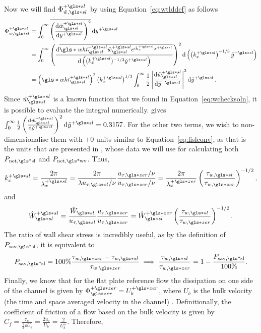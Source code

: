 Now we will find $\Phi _{\tilde{w},\gls*{sl}}\ps$ by using Equation~\eqref{eq:wtlddef} as follows
\begin{align}
	\Phi _{\tilde{w},\gls*{sl}}\ps &= \int_{0}^{\infty} \overline{\left( \dv{\tilde{w}\ssl\ps}{y\ps}  \right) ^2} \dd{y\ps}   \\
				       &= \int_{0}^{\infty} \left( \dv{\overline{\gls*{wht}\ps\ssl\check{w}\ssl\ps e^{ik\ps_x x\ps}}}{\left((k_x\ps)^{-1 /3}\check{y}\ps\right)}  \right) ^2 \dd{\left(\left(k_x\ps\right)^{-1 /3}\check{y}\ps\right)}   \\
				       &= \left(\gls*{wht}\ps\ssl\right)^2\left(k_x\ps\right)^{1 /3}\int_{0}^{\infty}\frac{1}{2} \left| \dv{\check{w}\ssl\ps}{\check{y}\ps}  \right| ^2 \dd{\check{y}\ps} \label{eq:fislps}
.\end{align}
Since $\check{w}\ssl\ps$ is a known function that we found in Equation~\eqref{eq:wchecksoln}, it is possible to evaluate the integral numerically. \textcite{chernyshenko2013} gives $\int_{0}^{\infty}  \frac{1}{2} \left( \dv{\check{w}\ssl\ps}{\check{y}\ps}  \right) ^2 \dd{\check{y}\ps} = 0.3157$. For the other two terms, we wish to non-dimensionalise them with $+0$ units similar to Equation~\eqref{eq:fislconv}, as that is the units that are presented in \textcite{viotti2009}, whose data we will use for calculating both $P_\text{net,\gls*{sl}} $ and $P_\text{net,\gls*{wv}} $. Thus,
\begin{equation}
	k_x\ps=\frac{2\pi}{\lambda_x\ps}=\frac{2\pi}{\lambda u_{\tau,\gls*{sl}}/\nu}\frac{u_{\tau,\gls*{zer}}/\nu}{u_{\tau,\gls*{zer}}/\nu}=\frac{2\pi}{\lambda_x\pz}\left( \frac{\tau_{w,\gls*{sl}}}{\tau_{w,\gls*{zer}}} \right) ^{-1 /2}\label{eq:kxslconv}
,\end{equation}
and
\begin{equation}
	\hat{W}\ps\ssl=\frac{\hat{W}\ssl}{u_{\tau,\gls*{sl}}}\frac{u_{\tau,\gls*{zer}}}{u_{\tau,\gls*{zer}}}=\hat{W}\ssl\pz\left( \frac{\tau_{w,\gls*{sl}}}{\tau_{w,\gls*{zer}}} \right) ^{-1 /2}\label{eq:whtslconv}
.\end{equation}
The ratio of wall shear stress is incredibly useful, as by the definition of $P_\text{sav,\gls*{sl}} $, it is equivalent to
\begin{equation}
	P_\text{sav,\gls*{sl}}=100\%\frac{\tau_{w,\gls*{zer}}-\tau_{w,\gls*{sl}}}{\tau_{w,\gls*{zer}}}\implies \frac{\tau_{w,\gls*{sl}}}{\tau_{w,\gls*{zer}}}= 1-\frac{ P_\text{sav,\gls*{sl}} }{100\%} \label{eq:taupsavconv}
.\end{equation}
Finally, we know that for the flat plate reference flow the dissipation on one side of the channel is given by	$\Phi \pz\zz = U_b\pz$, where $U_b$ is the bulk velocity (the time and space averaged velocity in the channel) \cite{chernyshenko2013}. Definitionally, the coefficient of friction of a flow based on the bulk velocity is given by $C_f=\frac{\tau_w}{\frac{1}{2}\rho U_b}=\frac{2u_{\tau}}{U_b}=\frac{2}{U_b^{+}}$. Therefore,
